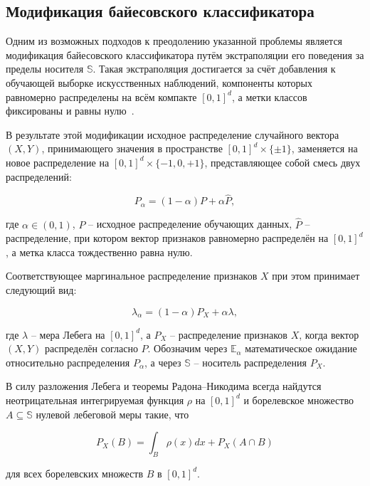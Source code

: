 \subsection{Модификация байесовского классификатора}\label{subsec:ch1/bayesian_classifier_modification}

Одним из возможных подходов к преодолению указанной проблемы является модификация байесовского классификатора путём экстраполяции его поведения за пределы носителя \(\mathbb{S}\). Такая экстраполяция достигается за счёт добавления к обучающей выборке искусственных наблюдений, компоненты которых равномерно распределены на всём компакте \([0, 1]^d\), а метки классов фиксированы и равны нулю~\cite{lukyanov2024extrapolation}.

В результате этой модификации исходное распределение случайного вектора \((X, Y)\), принимающего значения в пространстве \([0, 1]^d \times \{\pm 1\}\), заменяется на новое распределение на \([0, 1]^d \times \{-1, 0, +1\}\), представляющее собой смесь двух распределений:

\[
    P_\alpha = (1 - \alpha) P + \alpha \hat{P},
\]

где \(\alpha \in (0, 1)\), \(P\) -- исходное распределение обучающих данных, \(\hat{P}\) -- распределение, при котором вектор признаков равномерно распределён на \([0, 1]^d\), а метка класса тождественно равна нулю.

Соответствующее маргинальное распределение признаков \(X\) при этом принимает следующий вид:

\[
    \lambda_\alpha = (1 - \alpha) P_X + \alpha \lambda,
\]

где \(\lambda\) -- мера Лебега на \([0, 1]^d\), а \(P_X\) -- распределение признаков \(X\), когда вектор \((X, Y)\) распределён согласно \(P\). Обозначим через \(\mathbb{E}_\alpha\) математическое ожидание относительно распределения \(P_\alpha\), а через \(\mathbb{S}\) -- носитель распределения \(P_X\).

В силу разложения Лебега и теоремы Радона–Никодима всегда найдутся неотрицательная интегрируемая функция \(\rho\) на \([0, 1]^d\) и борелевское множество \(A \subseteq \mathbb{S}\) нулевой лебеговой меры такие, что

\[
    P_X(B) = \int_B \rho(x) dx + P_X(A \cap B)
\]

для всех борелевских множеств \(B\) в \([0, 1]^d\).


